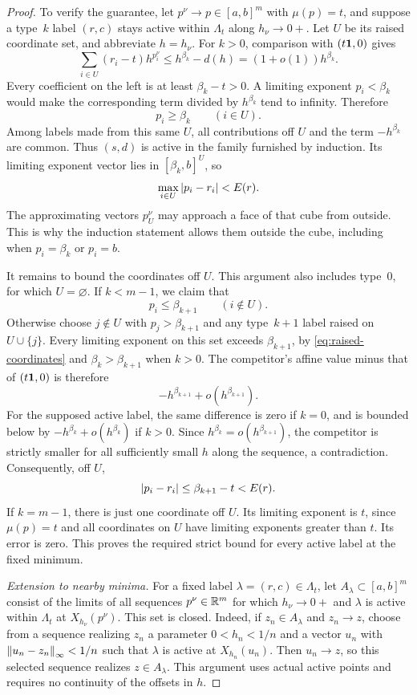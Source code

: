 \begin{proof}
To verify the guarantee, let $p^\nu\to p\in[a,b]^m$ with
$\mu(p)=t$, and suppose a type~$k$ label $(r,c)$ stays active within
$\Lambda_t$ along $h_\nu\to0+$. Let $U$ be its raised coordinate set,
and abbreviate $h=h_\nu$. For $k>0$, comparison with $(t\mathbf 1,0)$
gives
\[
 \sum_{i\in U}(r_i-t)h^{p_i^\nu}
 \leq h^{\beta_k}-d(h)=(1+o(1))h^{\beta_k}.
\]
Every coefficient on the left is at least $\beta_k-t>0$. A limiting
exponent $p_i<\beta_k$ would make the corresponding term divided by
$h^{\beta_k}$ tend to infinity. Therefore
\begin{equation}
 p_i\geq\beta_k\qquad(i\in U).
 \label{eq:raised-coordinates}
\end{equation}
Among labels made from this same $U$, all contributions off $U$ and
the term $-h^{\beta_k}$ are common. Thus $(s,d)$ is active in the
family furnished by induction. Its limiting exponent vector lies in
$[\beta_k,b]^U$, so
\[
 \max_{i\in U}\left|p_i-r_i\right|<E(r).
\]
The approximating vectors $p_U^\nu$ may approach a face of that cube
from outside. This is why the induction statement allows them outside
the cube, including when $p_i=\beta_k$ or $p_i=b$.

It remains to bound the coordinates off $U$. This argument also includes
type~$0$, for which $U=\varnothing$. If $k<m-1$, we claim that
\[
 p_i\leq\beta_{k+1}\qquad(i\notin U).
\]
Otherwise choose $j\notin U$ with $p_j>\beta_{k+1}$ and any
type~$k+1$ label raised on $U\cup\{j\}$. Every limiting exponent
on this set exceeds $\beta_{k+1}$, by
\eqref{eq:raised-coordinates} and $\beta_k>\beta_{k+1}$ when
$k>0$. The competitor's affine value minus that of $(t\mathbf 1,0)$ is
therefore
\[
 -h^{\beta_{k+1}}+o(h^{\beta_{k+1}}).
\]
For the supposed active label, the same difference is zero if $k=0$,
and is bounded below by $-h^{\beta_k}+o(h^{\beta_k})$ if $k>0$.
Since $h^{\beta_k}=o(h^{\beta_{k+1}})$, the competitor is strictly
smaller for all sufficiently small $h$ along the sequence, a
contradiction. Consequently, off $U$,
\[
 \left|p_i-r_i\right|\leq\beta_{k+1}-t<E(r).
\]
If $k=m-1$, there is just one coordinate off $U$. Its limiting exponent
is $t$, since $\mu(p)=t$ and all coordinates on $U$ have limiting
exponents greater than $t$. Its error is zero. This proves the required
strict bound for every active label at the fixed minimum.

\medskip
\noindent\emph{Extension to nearby minima.}
For a fixed label $\lambda=(r,c)\in\Lambda_t$, let
$A_\lambda\subset[a,b]^m$ consist of the limits of all sequences
$p^\nu\in\mathbb R^m$ for which $h_\nu\to0+$ and $\lambda$ is active
within $\Lambda_t$ at $X_{h_\nu}(p^\nu)$. This set is closed.
Indeed, if $z_n\in A_\lambda$ and $z_n\to z$, choose from a
sequence realizing $z_n$ a parameter $0<h_n<1/n$ and a vector $u_n$
with $\left\|u_n-z_n\right\|_\infty<1/n$ such that $\lambda$ is active at
$X_{h_n}(u_n)$.
Then $u_n\to z$, so this selected sequence realizes $z\in A_\lambda$.
This argument uses actual active points and requires no continuity of
the offsets in $h$.


\end{proof}
